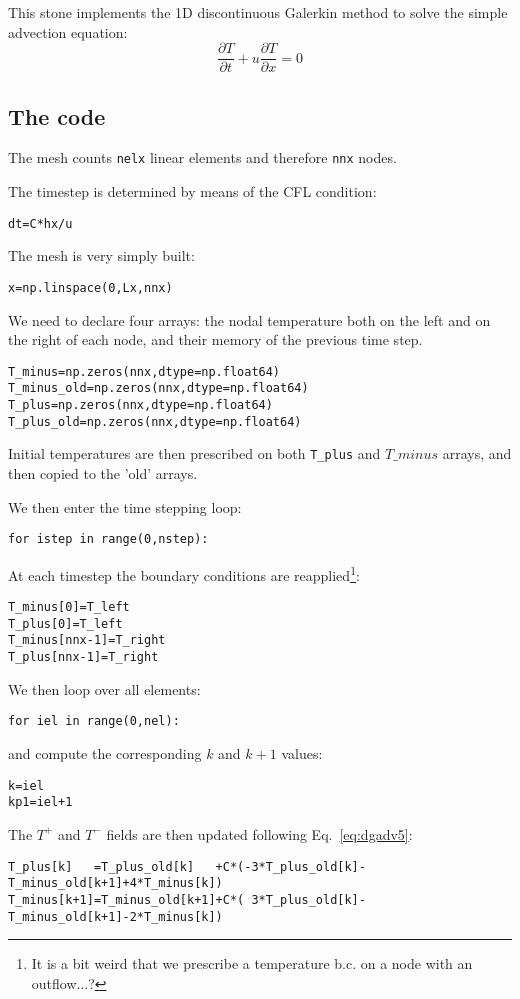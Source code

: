 

This stone implements the 1D discontinuous Galerkin method to solve the simple 
advection equation:
\[
\frac{\partial T}{\partial t} + u \frac{\partial T}{\partial x} = 0
\]




\subsection*{The code}

The mesh counts {\tt nelx} linear elements and therefore {\tt nnx} nodes.

The timestep is determined by means of the CFL condition:
\begin{lstlisting}
dt=C*hx/u
\end{lstlisting}
The mesh is very simply built:
\begin{lstlisting}
x=np.linspace(0,Lx,nnx)
\end{lstlisting}
We need to declare four arrays: the nodal temperature both on the left and 
on the right of each node, and their memory of the previous time step. 
\begin{lstlisting}
T_minus=np.zeros(nnx,dtype=np.float64)      
T_minus_old=np.zeros(nnx,dtype=np.float64)  
T_plus=np.zeros(nnx,dtype=np.float64)       
T_plus_old=np.zeros(nnx,dtype=np.float64)   
\end{lstlisting}
Initial temperatures are then prescribed on both {\tt T\_plus} 
and $T\_minus$ arrays, and then copied to the 'old' arrays.

We then enter the time stepping loop:
\begin{lstlisting}
for istep in range(0,nstep):
\end{lstlisting}
At each timestep the boundary conditions are reapplied\footnote{It is a bit weird that 
we prescribe a temperature b.c. on a node with an outflow...?}:
\begin{lstlisting}
T_minus[0]=T_left
T_plus[0]=T_left
T_minus[nnx-1]=T_right
T_plus[nnx-1]=T_right
\end{lstlisting}
We then loop over all elements:
\begin{lstlisting}
for iel in range(0,nel):
\end{lstlisting}
and compute the corresponding $k$ and $k+1$ values:
\begin{lstlisting}
k=iel
kp1=iel+1
\end{lstlisting}
The $T^+$ and $T^-$ fields are then updated following Eq.~\eqref{eq:dgadv5}:
\begin{lstlisting}
T_plus[k]   =T_plus_old[k]   +C*(-3*T_plus_old[k]-T_minus_old[k+1]+4*T_minus[k])
T_minus[k+1]=T_minus_old[k+1]+C*( 3*T_plus_old[k]-T_minus_old[k+1]-2*T_minus[k])
\end{lstlisting}








